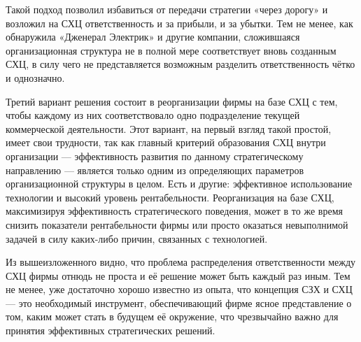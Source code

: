Такой подход позволил избавиться от передачи стратегии «через дорогу» и возложил на СХЦ ответственность и за прибыли, и за убытки. Тем не менее, как обнаружила «Дженерал Электрик» и другие компании, сложившаяся организационная структура не в полной мере соответствует вновь созданным СХЦ, в силу чего не представляется возможным разделить ответственность чётко и однозначно.

Третий вариант решения состоит в реорганизации фирмы на базе СХЦ с тем, чтобы каждому из них соответствовало одно подразделение текущей коммерческой деятельности. Этот вариант, на первый взгляд такой простой, имеет свои трудности, так как главный критерий образования СХЦ внутри организации — эффективность развития по данному стратегическому направлению — является только одним из определяющих параметров организационной структуры в целом. Есть и другие: эффективное использование технологии и высокий уровень рентабельности. Реорганизация на базе СХЦ, максимизируя эффективность стратегического поведения, может в то же время снизить показатели рентабельности фирмы или просто оказаться невыполнимой задачей в силу каких-либо причин, связанных с технологией.

Из вышеизложенного видно, что проблема распределения ответственности между СХЦ фирмы отнюдь не проста и её решение может быть каждый раз иным. Тем не менее, уже достаточно хорошо известно из опыта, что концепция СЗХ и СХЦ — это необходимый инструмент, обеспечивающий фирме ясное представление о том, каким может стать в будущем её окружение, что чрезвычайно важно для принятия эффективных стратегических решений.